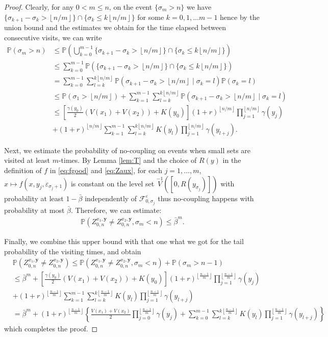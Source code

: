 \documentclass[a4paper,10pt]{article}
\newcommand{\F}{\mathcal{F}}
\renewcommand{\P}{\mathbb{P}}
\newcommand{\eps}{\varepsilon}
\newcommand{\ga}{\gamma}
\newcommand{\lfrf}[1]{\left\lfloor #1\right\rfloor}
\begin{document}
\begin{proof}
	Clearly, for any $0<m\le n$, on the event $\{\sigma_m>n\}$ we have $\{\sigma_{k+1}-\sigma_{k}>\lfrf{n/m}\}\cap\{\sigma_{k}\le k\lfrf{n/m}\}$ for some $k=0,1,\ldots m-1$ hence by the union bound and the estimates we obtain for the time elapsed between consecutive visits, we can write
	\begin{align*}
		\P (\sigma_m>n)&\le \P \left(\bigcup_{k=0}^{m-1} \{\sigma_{k+1}-\sigma_{k}>\lfrf{n/m}\}\cap\{\sigma_{k}\le k\lfrf{n/m}\}\right)
		\\
		&\le 
		\sum_{k=0}^{m-1}\P \left(\{\sigma_{k+1}-\sigma_{k}>\lfrf{n/m}\}\cap\{\sigma_{k}\le k\lfrf{n/m}\}\right)
		\\
		&=
		\sum_{k=0}^{m-1}\sum_{l=k}^{k\lfrf{n/m}}
		\P \left(\sigma_{k+1}-\sigma_{k}>\lfrf{n/m}\mid \sigma_{k}=l\right)\P(\sigma_{k}=l)
		\\
		&\le 
		\P(\sigma_{1}>\lfrf{n/m})+
			\sum_{k=1}^{m-1}\sum_{l=k}^{k\lfrf{n/m}}
		\P \left(\sigma_{k+1}-\sigma_{k}>\lfrf{n/m}\mid \sigma_{k}=l\right)
	\\
	&\le 
	\left[\frac{\ga (y_0)}{2}\left(V(x_1)+V(x_2)\right)+K(y_0)\right]
	(1+r)^{\lfrf{n/m}} \prod_{j=1}^{\lfrf{n/m}}\ga (y_j)
	\\
	&+
	(1+r)^{\lfrf{n/m}}\sum_{k=1}^{m-1}\sum_{l=k}^{k\lfrf{n/m}} K(y_l)\prod_{j=1}^{\lfrf{n/m}}\ga (y_{l+j}).
	\end{align*}
	
	Next, we estimate the probability of no-coupling on events when small sets are visited at least $m$-times. By Lemma \ref{lem:T} and the choice of $R(y)$ in the definition of $f$ in \eqref{eq:fgood} and \eqref{eq:Zaux}, for each $j=1,\ldots,m$, $x \mapsto f(x,y_j,\eps_{\sigma_j+1})$ is constant on the level set $\stackrel{-1}{V}([0,R(y_{\sigma_j})])$ with probability at least $1-\bar{\beta}$ 
	independently of $\F_{0,\sigma_j}^\eps$ thus no-coupling happens with probability at most $\bar{\beta}$.
	Therefore, we can estimate:
	\begin{align*}
	\P (Z_{0,n}^{x_1,\mathbf{y}}\ne Z_{0,n}^{x_2,\mathbf{y}},\sigma_{m}<n) 
	\le \bar{\beta}^m. 
	\end{align*}
	
	Finally, we combine this upper bound with that one what we got for the tail probability of the visiting times, and obtain
	\begin{align*}
	&\P (Z_{0,n}^{x_1,\mathbf{y}}\ne Z_{0,n}^{x_2,\mathbf{y}})
	\le 
	\P (Z_{0,n}^{x_1,\mathbf{y}}\ne Z_{0,n}^{x_2,\mathbf{y}},\sigma_{m}<n)
	+
	\P (\sigma_{m}> n-1)\\
	& \le
	\bar{\beta}^m
	+
	\left[\frac{\ga (y_0)}{2}\left(V(x_1)+V(x_2)\right)+K(y_0)\right]
	(1+r)^{\lfrf{\frac{n-1}{m}}} \prod_{j=1}^{\lfrf{\frac{n-1}{m}}}\ga (y_j)
	\\
	&+
	(1+r)^{\lfrf{\frac{n-1}{m}}}\sum_{k=1}^{m-1}\sum_{l=k}^{k\lfrf{\frac{n-1}{m}}} K(y_l)\prod_{j=1}^{\lfrf{\frac{n-1}{m}}}\ga (y_{l+j})
	\\
	&=
	\bar{\beta}^m
	+
	(1+r)^{\lfrf{\frac{n-1}{m}}}\left\{
	\frac{V(x_1)+V(x_2)}{2}\prod_{j=0}^{\lfrf{\frac{n-1}{m}}}\ga (y_j)
	+
	\sum_{k=0}^{m-1}\sum_{l=k}^{k\lfrf{\frac{n-1}{m}}} K(y_l)\prod_{j=1}^{\lfrf{\frac{n-1}{m}}}\ga (y_{l+j})
	\right\}
	\end{align*}
	which completes the proof.
	

\end{proof}
\end{document}

